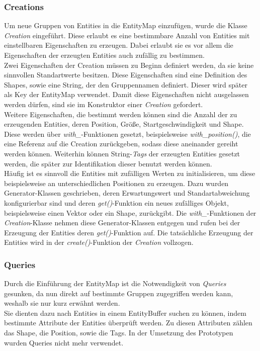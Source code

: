 \documentclass[11pt,a4paper]{article}
\begin{document}
\subsubsection{Creations}
Um neue Gruppen von Entities in die EntityMap einzufügen, wurde die Klasse \textit{Creation} eingeführt. Diese erlaubt es eine bestimmbare Anzahl von Entities mit einstellbaren Eigenschaften zu erzeugen. Dabei erlaubt sie es vor allem die Eigenschaften der erzeugten Entities auch zufällig zu bestimmen.\\
Zwei Eigenschaften der Creation müssen zu Beginn definiert werden, da sie keine sinnvollen Standartwerte besitzen. Diese Eigenschaften sind eine Definition des Shapes, sowie eine String, der den Gruppennamen definiert. Dieser wird später als Key der EntityMap verwendet. Damit diese Eigenschaften nicht ausgelassen werden dürfen, sind sie im Konstruktor einer \textit{Creation} gefordert.\\
Weitere Eigenschaften, die bestimmt werden können sind die Anzahl der zu erzeugenden Entities, deren Position, Größe, Startgeschwindigkeit und Shape. Diese werden über \textit{with\_}-Funktionen gesetzt, beispielsweise \textit{with\_position()}, die eine Referenz auf die Creation zurückgeben, sodass diese aneinander gereiht werden können. Weiterhin können String-\textit{Tags} der erzeugten Entities gesetzt werden, die später zur Identifikation dieser benutzt werden können.\\
Häufig ist es sinnvoll die Entities mit zufälligen Werten zu initialisieren, um diese beispielsweise an unterschiedlichen Positionen zu erzeugen. Dazu wurden Generator-Klassen geschrieben, deren Erwartungswert und Standartabweichung konfigurierbar sind und deren \textit{get()}-Funktion ein neues zufälliges Objekt, beispielsweise einen Vektor oder ein Shape, zurückgibt. Die \textit{with\_}-Funktionen der \textit{Creation}-Klasse nehmen diese Generator-Klassen entgegen und rufen bei der Erzeugung der Entities deren \textit{get()}-Funktion auf. Die tatsächliche Erzeugung der Entities wird in der \textit{create()}-Funktion der \textit{Creation} vollzogen.

\subsubsection{Queries}
Durch die Einführung der EntityMap ist die Notwendigkeit von \textit{Queries} gesunken, da nun direkt auf bestimmte Gruppen zugegriffen werden kann, weshalb sie nur kurz erwähnt werden.\\
Sie dienten dazu nach Entities in einem EntityBuffer suchen zu können, indem bestimmte Attribute der Entities überprüft werden. Zu diesen Attributen zählen das Shape, die Position, sowie die Tags. In der Umsetzung des Prototypen wurden Queries nicht mehr verwendet.
\end{document}

